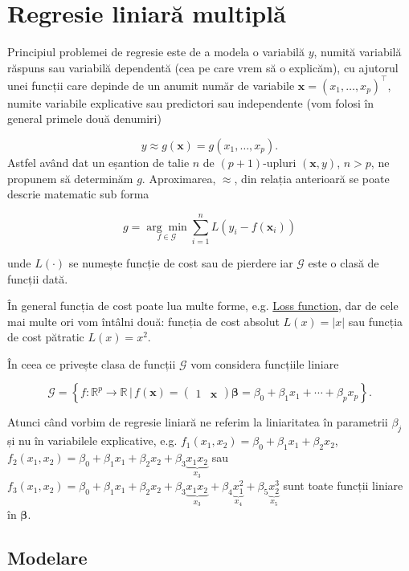 \documentclass[]{article}
\begin{document}
\section{Regresie liniară multiplă}\label{regresie-liniara-multipla}

Principiul problemei de regresie este de a modela o variabilă \(y\),
numită variabilă răspuns sau variabilă dependentă (cea pe care vrem să o
explicăm), cu ajutorul unei funcții care depinde de un anumit număr de
variabile \(\boldsymbol x = (x_1,\ldots, x_p)^\intercal\), numite
variabile explicative sau predictori sau independente (vom folosi în
general primele două denumiri)

\[
  y\approx g(\boldsymbol x) = g(x_1,\ldots, x_p).
\] Astfel având dat un eșantion de talie \(n\) de \((p+1)\)-upluri
\((\boldsymbol x, y)\), \(n>p\), ne propunem să determinăm \(g\).
Aproximarea, \(\approx\), din relația anterioară se poate descrie
matematic sub forma

\[
  g = \underset{f\in\mathcal{G}}{\arg\min}\sum_{i = 1}^{n}L\left(y_i - f(\boldsymbol x_i)\right)
\]

unde \(L(\cdot)\) se numește funcție de cost sau de pierdere iar
\(\mathcal{G}\) este o clasă de funcții dată.

În general funcția de cost poate lua multe forme, e.g.
\href{https://en.wikipedia.org/wiki/Loss_function}{Loss function}, dar
de cele mai multe ori vom întâlni două: funcția de cost absolut
\(L(x) = |x|\) sau funcția de cost pătratic \(L(x) = x^2\).

În ceea ce privește clasa de funcții \(\mathcal{G}\) vom considera
funcțiile liniare

\[
\mathcal{G} = \left\{f:\mathbb{R}^p\to \mathbb{R}\,|\, f(\boldsymbol x) = \begin{pmatrix}1 & \boldsymbol x\end{pmatrix} \boldsymbol \beta = \beta_0 + \beta_1 x_1 +\cdots + \beta_p x_p\right\}.
\]

Atunci când vorbim de regresie liniară ne referim la liniaritatea în
parametrii \(\beta_j\) și nu în variabilele explicative, e.g.
\(f_1(x_1,x_2) = \beta_0 + \beta_1 x_1 + \beta_2 x_2\),
\(f_2(x_1, x_2) = \beta_0 + \beta_1 x_1 + \beta_2 x_2 + \beta_3 \underbrace{x_1 x_2}_{x_3}\)
sau
\(f_3(x_1, x_2) = \beta_0 + \beta_1 x_1 + \beta_2 x_2 + \beta_3 \underbrace{x_1 x_2}_{x_3}+ \beta_4 \underbrace{x_1^2}_{x_4}+ \beta_5 \underbrace{x_2^3}_{x_5}\)
sunt toate funcții liniare în \(\boldsymbol\beta\).

\subsection{Modelare}\label{modelare}
\end{document}
